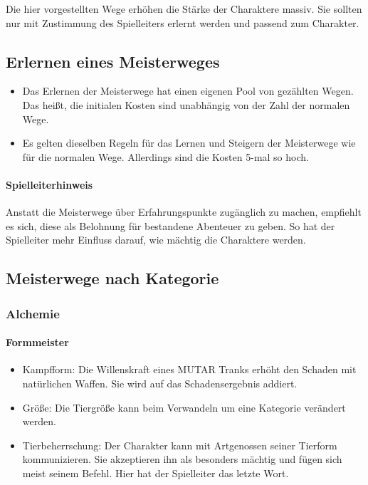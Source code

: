 \documentclass{article}
\begin{document}
Die hier vorgestellten Wege erhöhen die Stärke der Charaktere massiv. Sie sollten nur mit Zustimmung des Spielleiters
erlernt werden und passend zum Charakter.

\begin{center}
\subsection{Erlernen eines Meisterweges}
\end{center}

\begin{itemize}
\item Das Erlernen der Meisterwege hat einen eigenen Pool von gezählten Wegen. Das heißt, die initialen Kosten sind unabhängig von der Zahl der normalen Wege.
\item Es gelten dieselben Regeln für das Lernen und Steigern der Meisterwege wie für die normalen Wege. Allerdings sind die Kosten 5-mal so hoch.
\end{itemize}

\begin{mdframed}[hidealllines=true, backgroundcolor=black!10]
\paragraph{Spielleiterhinweis}

Anstatt die Meisterwege über Erfahrungspunkte zugänglich zu machen, empfiehlt es sich, diese als Belohnung für
bestandene Abenteuer zu geben. So hat der Spielleiter mehr Einfluss darauf, wie mächtig die Charaktere werden.

\end{mdframed}
\begin{center}
\subsection{Meisterwege nach Kategorie}
\end{center}

\subsubsection{Alchemie}

\paragraph{Formmeister}

\begin{itemize}
\item Kampfform: Die Willenskraft eines MUTAR Tranks erhöht den Schaden mit natürlichen Waffen. Sie wird auf das Schadensergebnis addiert.
\item Größe: Die Tiergröße kann beim Verwandeln um eine Kategorie verändert werden.
\item Tierbeherrschung: Der Charakter kann mit Artgenossen seiner Tierform kommunizieren. Sie akzeptieren ihn als besonders mächtig und fügen sich meist seinem Befehl. Hier hat der Spielleiter das letzte Wort.
\end{itemize}
\end{document}
